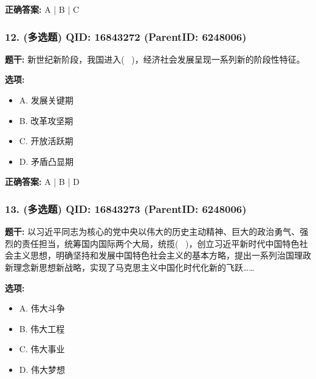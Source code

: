 \documentclass[12pt,UTF8]{ctexart}
\begin{document}
\textbf{正确答案:}
A | B | C

\vspace{0.3em}\hrulefill\vspace{0.7em}

\subsubsection*{12. (多选题) \small QID: 16843272 (ParentID: 6248006)}

\textbf{题干:}
新世纪新阶段，我国进入(  )，经济社会发展呈现一系列新的阶段性特征。



\textbf{选项:}
\begin{itemize}[leftmargin=*]

  \item A. 发展关键期

  \item B. 改革攻坚期

  \item C. 开放活跃期

  \item D. 矛盾凸显期

\end{itemize}

\textbf{正确答案:}
A | B | D

\vspace{0.3em}\hrulefill\vspace{0.7em}

\subsubsection*{13. (多选题) \small QID: 16843273 (ParentID: 6248006)}

\textbf{题干:}
以习近平同志为核心的党中央以伟大的历史主动精神、巨大的政治勇气、强烈的责任担当，统筹国内国际两个大局，统揽(  )，创立习近平新时代中国特色社会主义思想，明确坚持和发展中国特色社会主义的基本方略，提出一系列治国理政新理念新思想新战略，实现了马克思主义中国化时代化新的飞跃……



\textbf{选项:}
\begin{itemize}[leftmargin=*]

  \item A. 伟大斗争

  \item B. 伟大工程

  \item C. 伟大事业

  \item D. 伟大梦想

\end{itemize}
\end{document}
